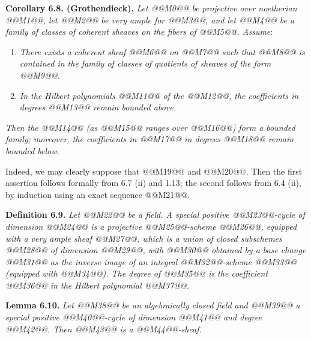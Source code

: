 \textbf{Corollary 6.8. (Grothendieck).} \emph{Let @@M0@@ be projective over noetherian @@M1@@, let @@M2@@ be very ample for @@M3@@, and let @@M4@@ be a family of classes of coherent sheaves on the fibers of @@M5@@. Assume}:
\begin{enumerate}[label=(\alph*)]
\item \emph{There exists a coherent sheaf @@M6@@ on @@M7@@ such that @@M8@@ is contained in the family of classes of quotients of sheaves of the form @@M9@@.}
\item[@@M10@@] \emph{In the Hilbert polynomials @@M11@@ of the @@M12@@, the coefficients in degrees @@M13@@ remain bounded above.}
\end{enumerate}
\emph{Then the @@M14@@ (as @@M15@@ ranges over @@M16@@) form a bounded family; moreover, the coefficients in @@M17@@ in degrees @@M18@@ remain bounded below.}

Indeed, we may clearly suppose that @@M19@@ and @@M20@@. Then the first assertion follows formally from 6.7 (ii) and 1.13; the second follows from 6.4 (ii), by induction using an exact sequence @@M21@@.

\textbf{Definition 6.9.} \emph{Let @@M22@@ be a field. A \emph{special positive @@M23@@-cycle of dimension @@M24@@} is a projective @@M25@@-scheme @@M26@@, equipped with a very ample sheaf @@M27@@, which is a union of closed subschemes @@M28@@ of dimension @@M29@@, with @@M30@@ obtained by a base change @@M31@@ as the inverse image of an \emph{integral} @@M32@@-scheme @@M33@@ (equipped with @@M34@@). The \emph{degree} of @@M35@@ is the coefficient @@M36@@ in the Hilbert polynomial @@M37@@.}

\textbf{Lemma 6.10.} \emph{Let @@M38@@ be an algebraically closed field and @@M39@@ a special positive @@M40@@-cycle of dimension @@M41@@ and degree @@M42@@. Then @@M43@@ is a @@M44@@-sheaf.}

